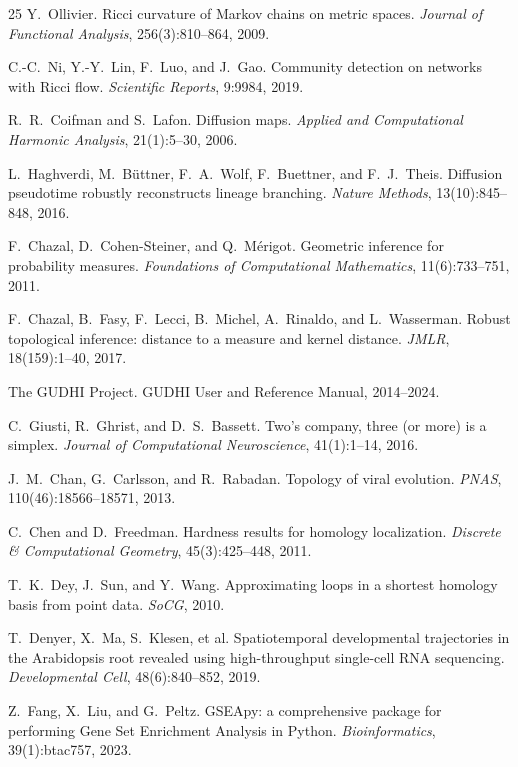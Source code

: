 \documentclass[12pt]{article}
\begin{document}
\begin{thebibliography}{25}
Y.~Ollivier.
Ricci curvature of Markov chains on metric spaces.
\emph{Journal of Functional Analysis}, 256(3):810--864, 2009.

C.-C.~Ni, Y.-Y.~Lin, F.~Luo, and J.~Gao.
Community detection on networks with Ricci flow.
\emph{Scientific Reports}, 9:9984, 2019.

R.~R.~Coifman and S.~Lafon.
Diffusion maps.
\emph{Applied and Computational Harmonic Analysis}, 21(1):5--30, 2006.

L.~Haghverdi, M.~B\"uttner, F.~A.~Wolf, F.~Buettner, and F.~J.~Theis.
Diffusion pseudotime robustly reconstructs lineage branching.
\emph{Nature Methods}, 13(10):845--848, 2016.

F.~Chazal, D.~Cohen-Steiner, and Q.~M\'erigot.
Geometric inference for probability measures.
\emph{Foundations of Computational Mathematics}, 11(6):733--751, 2011.

F.~Chazal, B.~Fasy, F.~Lecci, B.~Michel, A.~Rinaldo, and L.~Wasserman.
Robust topological inference: distance to a measure and kernel distance.
\emph{JMLR}, 18(159):1--40, 2017.

The GUDHI Project.
GUDHI User and Reference Manual, 2014--2024.

C.~Giusti, R.~Ghrist, and D.~S.~Bassett.
Two's company, three (or more) is a simplex.
\emph{Journal of Computational Neuroscience}, 41(1):1--14, 2016.

J.~M.~Chan, G.~Carlsson, and R.~Rabadan.
Topology of viral evolution.
\emph{PNAS}, 110(46):18566--18571, 2013.

C.~Chen and D.~Freedman.
Hardness results for homology localization.
\emph{Discrete \& Computational Geometry}, 45(3):425--448, 2011.

T.~K.~Dey, J.~Sun, and Y.~Wang.
Approximating loops in a shortest homology basis from point data.
\emph{SoCG}, 2010.

T.~Denyer, X.~Ma, S.~Klesen, et al.
Spatiotemporal developmental trajectories in the Arabidopsis root revealed using high-throughput single-cell RNA sequencing.
\emph{Developmental Cell}, 48(6):840--852, 2019.

Z.~Fang, X.~Liu, and G.~Peltz.
GSEApy: a comprehensive package for performing Gene Set Enrichment Analysis in Python.
\emph{Bioinformatics}, 39(1):btac757, 2023.

\end{thebibliography}
\end{document}
